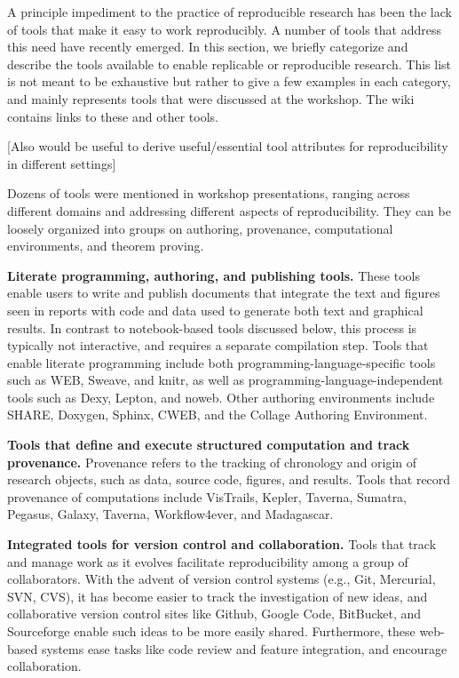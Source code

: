 \documentclass[11pt]{article}
\newcommand{\comment}[1]{{\color{blue} [#1]}}
\newcommand{\comment}[1]{}
\begin{document}
A principle impediment to the practice of reproducible research has been the
lack of tools that make it easy to work reproducibly.  A number of tools
that address this need have recently emerged.  In this section, we briefly
categorize and describe the tools available to enable replicable or
reproducible research.  This list is not meant to be exhaustive but rather
to give a few examples in each category, and mainly
represents tools that were discussed at the workshop. 
The wiki contains links to these and other tools.

\comment{Also would be useful
to derive useful/essential tool attributes for reproducibility in different
settings}

Dozens of tools were mentioned in workshop presentations, ranging
across different domains and addressing different aspects of
reproducibility.  They can be loosely organized into groups on authoring,
provenance, computational environments, and theorem proving.  

{\bf Literate programming, authoring, and publishing tools.} These tools enable
users to write and publish documents that integrate the text and figures
seen in reports with code and data used to generate both text and graphical
results. In contrast to notebook-based tools discussed below, 
this process is typically not
interactive, and requires a separate compilation step. Tools that enable
literate programming include both programming-language-specific tools such
as WEB, Sweave, and knitr, as well as programming-language-independent tools
such as Dexy, Lepton, and noweb. Other authoring environments include SHARE,
Doxygen, Sphinx, CWEB, and the Collage Authoring Environment.



{\bf Tools that define and execute structured computation and track
provenance.}
Provenance refers to the tracking of chronology and origin of research
objects, such as data, source code, figures, and results. Tools that record
provenance of computations include VisTrails, Kepler, Taverna, Sumatra,
Pegasus, Galaxy, Taverna, Workflow4ever, and Madagascar.

{\bf Integrated tools for version control and collaboration.}  Tools that track
and manage work as it evolves facilitate reproducibility among a group of
collaborators.  With the advent of version control systems (e.g., Git,
Mercurial, SVN, CVS), it has become easier to track the investigation of new
ideas, and collaborative version control sites like Github, Google Code,
BitBucket, and Sourceforge enable such ideas to be more easily shared.
Furthermore, these web-based systems ease tasks like code review and feature
integration, and encourage collaboration.
\end{document}
